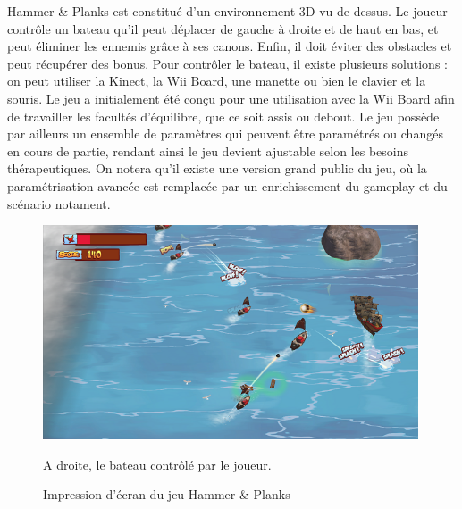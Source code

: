 Hammer \& Planks est constitué d’un environnement 3D vu de dessus. Le joueur contrôle un bateau qu'il peut déplacer de gauche à droite et de haut en bas, et peut éliminer les ennemis grâce à ses canons. Enfin, il doit éviter des obstacles et peut récupérer des bonus. Pour contrôler le bateau, il existe plusieurs solutions : on peut utiliser la Kinect, la Wii Board, une manette ou bien le clavier et la souris. Le jeu a initialement été conçu pour une utilisation avec la Wii Board afin de travailler les facultés d'équilibre, que ce soit assis ou debout. Le jeu possède par ailleurs un ensemble de paramètres qui peuvent être paramétrés ou changés en cours de partie, rendant ainsi le jeu devient ajustable selon les besoins thérapeutiques. On notera qu'il existe une version grand public du jeu, où la paramétrisation avancée est remplacée par un enrichissement du gameplay et du scénario notament.
	\begin{figure}[!h]
		\centering
		\includegraphics[width=420px]{images/hammer_and_planks.png}
		\caption{Impression d'écran du jeu Hammer \& Planks}
		A droite, le bateau contrôlé par le joueur.
		\label{hammer_and_planks}
	\end{figure}
